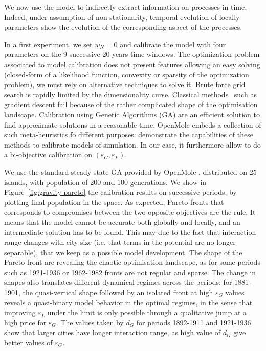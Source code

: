 \documentclass[Royal,sageh,times]{sagej}
\begin{document}
We now use the model to indirectly extract information on processes in time. Indeed, under assumption of non-stationarity,  temporal evolution of locally  parameters show the evolution of the corresponding aspect of the processes.

In a first experiment, we set $w_N=0$ and calibrate the model with four parameters on the 9 successive 20 years time windows. The optimization problem associated to model calibration does not present features allowing an easy solving (closed-form of a likelihood function, convexity or sparsity of the optimization problem), we must rely on alternative techniques to solve it. Brute force grid search is rapidly limited by the dimensionality curse. Classical methods~\citep{batty1972calibration} such as gradient descent fail because of the rather complicated shape of the optimisation landscape. Calibration using Genetic Algorithms (GA) are an efficient solution to find approximate solutions in a reasonable time. OpenMole embeds a collection of such meta-heuristics fo different purposes: \cite{schmitt2014half} demonstrate the capabilities of these methods to calibrate models of simulation. In our case, it furthermore allow to do a bi-objective calibration on $(\varepsilon_G,\varepsilon_L)$.

We use the standard steady state GA provided by OpenMole , distributed on 25 islands, with  population of 200  and 100 generations. We show in Figure~\ref{fig:gravity-pareto} the calibration results on successive periods, by plotting final population in the  space. As expected, Pareto fronts that corresponds to compromises between the two opposite objectives are the rule. It means that the model cannot be accurate both globally and locally, and an intermediate solution has to be found. This may due to the fact that interaction range changes with city size (i.e. that terms in the potential are no longer separable), that we keep as a possible model development. The shape of the Pareto front are revealing the chaotic optimisation landscape, as for some periods such as 1921-1936 or 1962-1982 fronts are not regular and sparse. The change in shapes also translates different dynamical regimes across the periods: for 1881-1901, the quasi-vertical shape followed by an isolated front at high $\varepsilon_G$ values reveals a quasi-binary model behavior in the optimal regimes, in the sense that improving $\varepsilon_L$ under the limit is only possible through a qualitative jump at a high price for $\varepsilon_G$. The values taken by $d_G$ for periods 1892-1911 and 1921-1936 show that larger cities have longer interaction range, as high value of $d_G$ give better values of $\varepsilon_G$.
\end{document}
